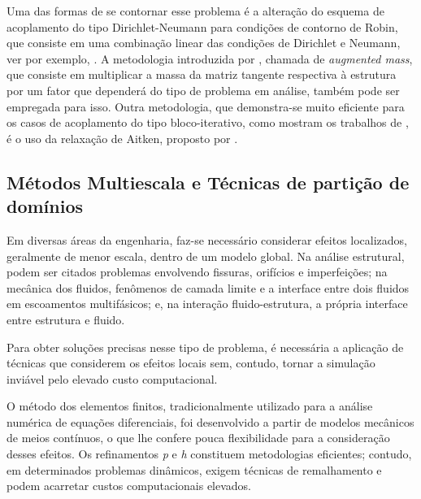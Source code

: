 \documentclass[tese_patricia.tex]{subfiles}
\begin{document}
Uma das formas de se contornar esse problema é a alteração do esquema de acoplamento do tipo Dirichlet-Neumann para condições de contorno de Robin, que consiste em uma combinação linear das condições de Dirichlet e Neumann, ver por exemplo, . A metodologia introduzida por , chamada de \textit{augmented mass}, que consiste em multiplicar a massa da matriz tangente respectiva à estrutura por um fator que dependerá do tipo de problema em análise, também pode ser empregada para isso. Outra metodologia, que demonstra-se muito eficiente para os casos de acoplamento do tipo bloco-iterativo, como mostram os trabalhos de \cite{KuttlerW:2008,FernandesCS:2019}, é o uso da relaxação de Aitken, proposto por .

 
\subsection{Métodos Multiescala e Técnicas de partição de domínios}
\label{arlequinsection}

Em diversas áreas da engenharia, faz-se necessário considerar efeitos localizados, geralmente de menor escala, dentro de um modelo global. Na análise estrutural, podem ser citados problemas envolvendo fissuras, orifícios e imperfeições; na mecânica dos fluidos, fenômenos de camada limite e a interface entre dois fluidos em escoamentos multifásicos; e, na interação fluido-estrutura, a própria interface entre estrutura e fluido.

Para obter soluções precisas nesse tipo de problema, é necessária a aplicação de técnicas que considerem os efeitos locais sem, contudo, tornar a simulação inviável pelo elevado custo computacional.

O método dos elementos finitos, tradicionalmente utilizado para a análise numérica de equações diferenciais, foi desenvolvido a partir de modelos mecânicos de meios contínuos, o que lhe confere pouca flexibilidade para a consideração desses efeitos. Os refinamentos \textit{p} e \textit{h} constituem metodologias eficientes; contudo, em determinados problemas dinâmicos, exigem técnicas de remalhamento e podem acarretar custos computacionais elevados.
\end{document}
